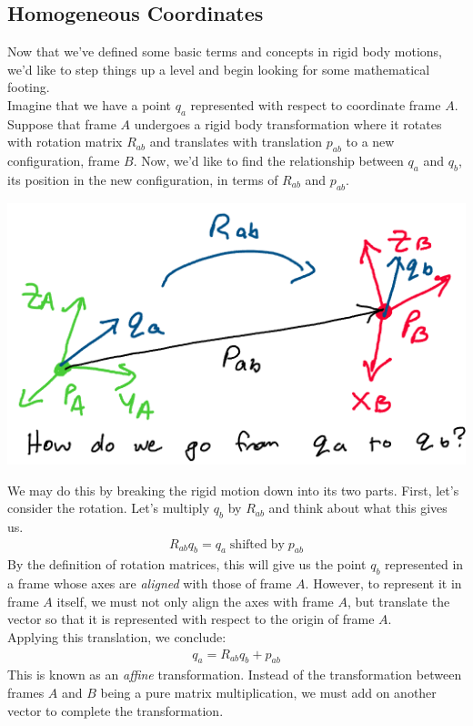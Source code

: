 \documentclass[oneside]{book}
\begin{document}
\subsection{Homogeneous Coordinates}
Now that we've defined some basic terms and concepts in rigid body motions, we'd like to step things up a level and begin looking for some mathematical footing.\\
Imagine that we have a point $q_a$ represented with respect to coordinate frame $A$. Suppose that frame $A$ undergoes a rigid body transformation where it rotates with rotation matrix $R_{ab}$ and translates with translation $p_{ab}$ to a new configuration, frame $B$. Now, we'd like to find the relationship between $q_a$ and $q_b$, its position in the new configuration, in terms of $R_{ab}$ and $p_{ab}$.
\begin{center}
    \includegraphics[scale=0.5]{images/qab_transform.png}
\end{center}
We may do this by breaking the rigid motion down into its two parts. First, let's consider the rotation. Let's multiply $q_b$ by $R_{ab}$ and think about what this gives us.
\begin{align}
    R_{ab}q_b = q_a\mathrm{\; shifted \; by \;} p_{ab}
\end{align}
By the definition of rotation matrices, this will give us the point $q_b$ represented in a frame whose axes are \textit{aligned} with those of frame $A$. However, to represent it in frame $A$ itself, we must not only align the axes with frame $A$, but translate the vector so that it is represented with respect to the origin of frame $A$.\\
Applying this translation, we conclude:
\begin{align}
    q_a = R_{ab}q_b + p_{ab}
\end{align}
This is known as an \textit{affine} transformation. Instead of the transformation between frames $A$ and $B$ being a pure matrix multiplication, we must add on another vector to complete the transformation.\\
\end{document}
